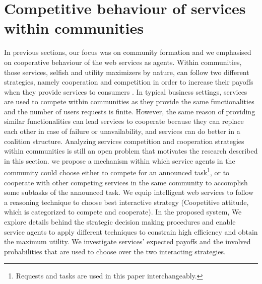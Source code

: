 

\section{Competitive behaviour of services within communities}\label{s:coop}

In previous sections, our focus was on community formation and we emphasised on cooperative behaviour of the web services as agents. Within communities, those services, selfish and utility maximizers by nature, can follow two different strategies, namely cooperation and competition in order to increase their payoffs when they provide services to consumers \cite{VuFind-10008938119}. In typical business settings, services are used to compete within communities as they provide the same functionalities and the number of users requests is finite. However, the same reason of providing similar functionalities can lead services to cooperate because they can replace each other in case of failure or unavailability, and services can do better in a coalition structure. Analyzing services competition and cooperation strategies within communities is still an open problem that motivates the research described in this section. we propose a mechanism within which service agents
in the community could choose either to compete for an announced task\footnote{Requests and tasks are used in this paper interchangeably.}, or to cooperate with other competing services in the same community to accomplish some subtasks of the announced task. We equip intelligent web services to follow a reasoning technique to choose best interactive strategy (Coopetitive attitude, which is categorized to compete and cooperate). In the proposed system, We explore details behind the strategic decision making procedures and enable service agents to apply different techniques to constrain high efficiency and obtain the maximum utility. We investigate services' expected payoffs and the involved probabilities that are used to choose over the two interacting strategies.









